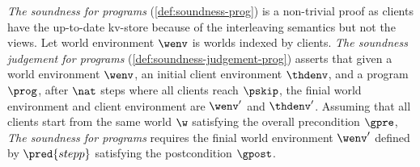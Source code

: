 \emph{The soundness for programs} (\cref{def:soundness-prog}) is a non-trivial proof as clients have the up-to-date kv-store because of the interleaving semantics but not the views.
Let world environment \( \wenv \) is worlds indexed by clients.
\emph{The soundness judgement for programs} (\cref{def:soundness-judgement-prog}) asserts that given a world environment \( \wenv \), an initial client environment \( \thdenv \), and a program \( \prog\), after \( \nat \)  steps where all clients reach \( \pskip \), the finial world environment and client environment are \( \wenv' \) and \( \thdenv' \).
Assuming that all clients start from the same world \( \w \) satisfying the overall precondition \( \gpre \), \emph{The soundness for programs} requires the finial world environment \( \wenv' \) defined by \( \pred{stepp} \) satisfying the postcondition \( \gpost \).

